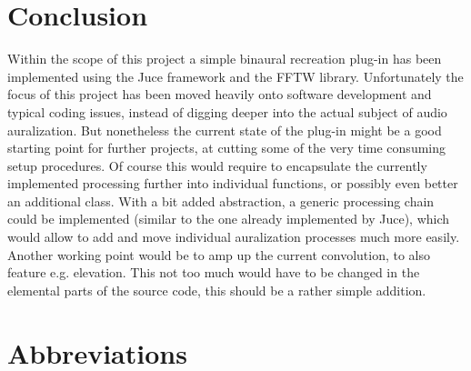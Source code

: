 \documentclass[a4paper,11pt]{article}%
\renewcommand{\\}{\vspace*{0.5\baselineskip} \newline}
\begin{document}
\section{Conclusion}
\label{sec:conclusion}
Within the scope of this project a simple binaural recreation plug-in has been implemented using the Juce framework and the FFTW library. Unfortunately the focus of this project has been moved heavily onto software development and typical coding issues, instead of digging deeper into the actual subject of audio auralization. But nonetheless the current state of the plug-in might be a good starting point for further projects, at cutting some of the very time consuming setup procedures. Of course this would require to encapsulate the currently implemented processing further into individual functions, or possibly even better an additional class. With a bit added abstraction, a generic processing chain could be implemented (similar to the one already implemented by Juce), which would allow to add and move individual auralization processes much more easily. Another working point would be to amp up the current convolution, to also feature e.g. elevation. This not too much would have to be changed in the elemental parts of the source code, this should be a rather simple addition.



\newpage
\section*{Abbreviations}
\vspace{5mm}
\begin{acronym}[SEVENLTH]
\end{acronym}
\end{document}
